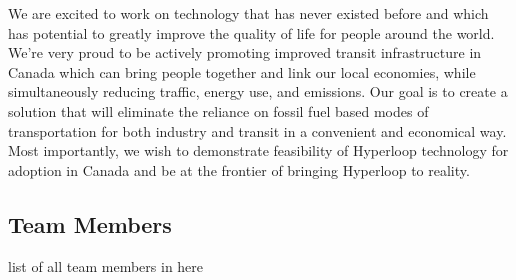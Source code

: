 \documentclass[11pt,a4paper,oldfontcommands]{memoir}
\begin{document}
   We are excited to work on technology that has never existed before and which has potential to greatly improve the quality of life for people around the world. We’re very proud to be actively promoting improved transit infrastructure in Canada which can bring people together and link our local economies, while simultaneously reducing traffic, energy use, and emissions. Our goal is to create a solution that will eliminate the reliance on fossil fuel based modes of transportation for both industry and transit in a convenient and economical way. Most importantly, we wish to demonstrate feasibility of Hyperloop technology for adoption in Canada and be at the frontier of bringing Hyperloop to reality.

   \subsection{Team Members}
   list of all team members in here
\end{document}
